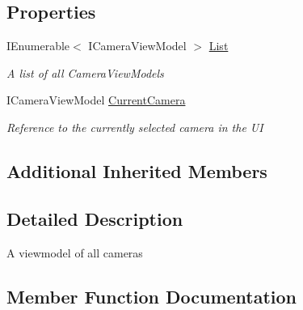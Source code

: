 \subsection*{Properties}
\begin{DoxyCompactItemize}
\item 
I\+Enumerable$<$ I\+Camera\+View\+Model $>$ \mbox{\hyperlink{class_pic_d_b_1_1_view_models_1_1_camera_list_view_model_a7848fd33611b1899274874b8ff78e792}{List}}
\begin{DoxyCompactList}\small\item\em A list of all Camera\+View\+Models \end{DoxyCompactList}\item 
I\+Camera\+View\+Model \mbox{\hyperlink{class_pic_d_b_1_1_view_models_1_1_camera_list_view_model_a757a0c21bba1b4653fd9d43cb396afae}{Current\+Camera}}
\begin{DoxyCompactList}\small\item\em Reference to the currently selected camera in the UI \end{DoxyCompactList}\end{DoxyCompactItemize}
\subsection*{Additional Inherited Members}


\subsection{Detailed Description}
A viewmodel of all cameras 



\subsection{Member Function Documentation}
\mbox{\label{class_pic_d_b_1_1_view_models_1_1_camera_list_view_model_a7bf15c41092b0fb555a5b0943bc81807}} 
